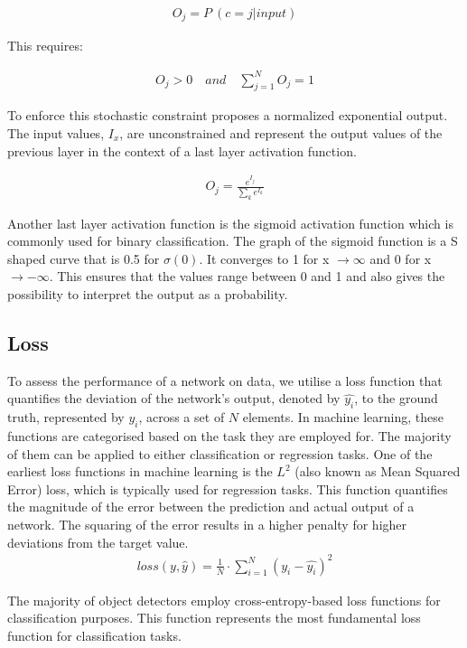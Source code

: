 \documentclass[
a4paper, 
12pt,
grayscalebody, %
abstract=on,
twoside, BCOR10mm, 12pt, DIV13,headinclude, footexclude, final, abstracton, openright
]{ibireprt}
\numberwithin{equation}{chapter}
\numberwithin{table}{chapter}
\numberwithin{figure}{chapter}
\numberwithin{algorithm}{chapter}
\numberwithin{example}{chapter}
\numberwithin{example}{chapter}
\begin{document}
\begin{align}
	O_j = P \ (c= j | input)
\end{align}

This requires: 

\begin{align}
	O_j > 0 
	\quad and \quad
	\sum_{j=1}^{N} O_j = 1 
\end{align}

 
To enforce this stochastic constraint \citet{Bridle1990} proposes a normalized exponential output. The input values, $I_x$, are unconstrained and represent the output values of the previous layer in the context of a last layer activation function. 

\begin{align}
	O_j = \frac{e^{I_j}}{\sum_{k}^{} e^{I_k}} 	
\end{align}

Another last layer activation function is the sigmoid activation function which is commonly used for binary classification.
The graph of the sigmoid function is a S shaped curve that is 0.5 for $\sigma(0)$. It converges to 1 for x $\rightarrow \infty$ and 0 for x $\rightarrow -\infty$. This ensures that the values range between 0 and 1 and also gives the possibility to interpret the output as a probability. 


\subsection{Loss}


To assess the performance of a network on data, we utilise a loss function that quantifies the deviation of the network's output, denoted by $\hat{y_i}$, to the ground truth, represented by $y_i$, across a set of $N$ elements. In machine learning, these functions are categorised based on the task they are employed for. The majority of them can be applied to either classification or regression tasks. One of the earliest loss functions in machine learning is the $L^2$ (also known as Mean Squared Error) loss, which is typically used for regression tasks. This function quantifies the magnitude of the error between the prediction and actual output of a network. The squaring of the error results in a higher penalty for higher deviations from the target value. 
\begin{align}
	loss(y,\hat{y})=\frac{1}{N}\cdot \sum^{N}_{i=1}(y_i-\hat{y_i})^2
\end{align}

The majority of object detectors employ cross-entropy-based loss functions for classification purposes. This function represents the most fundamental loss function for classification tasks. 
\end{document}
